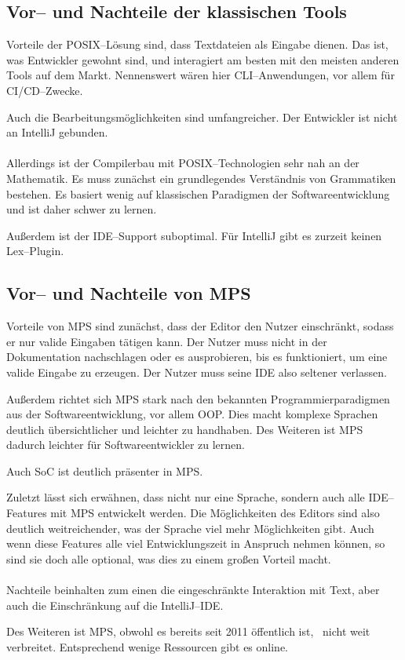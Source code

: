 \subsection{Vor-- und Nachteile der klassischen Tools}\label{subsec:vor---und-nachteile-der-klassischen-tools}
Vorteile der \ac{POSIX}--Lösung sind, dass Textdateien als Eingabe dienen.
Das ist, was Entwickler gewohnt sind, und interagiert am besten mit den meisten anderen Tools auf dem Markt.
Nennenswert wären hier \acs{CLI}--Anwendungen, vor allem für \acs{CI}/\acs{CD}--Zwecke.

Auch die Bearbeitungsmöglichkeiten sind umfangreicher.
Der Entwickler ist nicht an IntelliJ gebunden.

\paragraph*{}
Allerdings ist der Compilerbau mit \acs{POSIX}--Technologien sehr nah an der Mathematik.
Es muss zunächst ein grundlegendes Verständnis von Grammatiken bestehen.
Es basiert wenig auf klassischen Paradigmen der Softwareentwicklung und ist daher schwer zu lernen.

Außerdem ist der \ac{IDE}--Support suboptimal.
Für IntelliJ gibt es zurzeit keinen Lex--Plugin.

\subsection{Vor-- und Nachteile von \acs{MPS}}\label{subsec:vor---und-nachteile-von-mps}
Vorteile von \ac{MPS} sind zunächst, dass der Editor den Nutzer einschränkt, sodass er nur valide Eingaben tätigen kann.
Der Nutzer muss nicht in der Dokumentation nachschlagen oder es ausprobieren, bis es funktioniert, um eine valide Eingabe zu erzeugen.
Der Nutzer muss seine \ac{IDE} also seltener verlassen.

Außerdem richtet sich \ac{MPS} stark nach den bekannten Programmierparadigmen aus der Softwareentwicklung, vor allem \ac{OOP}.
Dies macht komplexe Sprachen deutlich übersichtlicher und leichter zu handhaben.
Des Weiteren ist \ac{MPS} dadurch leichter für Softwareentwickler zu lernen.

Auch \ac{SoC} ist deutlich präsenter in \ac{MPS}.

Zuletzt lässt sich erwähnen, dass nicht nur eine Sprache, sondern auch alle \acs{IDE}--Features mit \ac{MPS} entwickelt werden.
Die Möglichkeiten des Editors sind also deutlich weitreichender, was der Sprache viel mehr Möglichkeiten gibt.
Auch wenn diese Features alle viel Entwicklungszeit in Anspruch nehmen können, so sind sie doch alle optional, was dies zu einem großen Vorteil macht.

\paragraph*{}
Nachteile beinhalten zum einen die eingeschränkte Interaktion mit Text, aber auch die Einschränkung auf die IntelliJ--\acs{IDE}.

Des Weiteren ist \ac{MPS}, obwohl es bereits seit 2011 öffentlich ist,~\autocite{wikipedia-contributors-2024I} nicht weit verbreitet.
Entsprechend wenige Ressourcen gibt es online.
